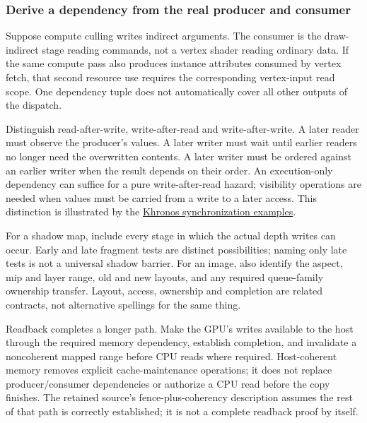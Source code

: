 \subsubsection{Derive a dependency from the real producer and consumer}\label{05-engine-i-ch019-derive-a-dependency-from-the-real-producer-and-consumer}

\hypertarget{05-engine-i-ch019-derive-a-dependency-from-the-real-producer-and-consumer}{}

Suppose compute culling writes indirect arguments. The consumer is the draw-indirect stage reading commands, not a vertex shader reading ordinary data. If the same compute pass also produces instance attributes consumed by vertex fetch, that second resource use requires the corresponding vertex-input read scope. One dependency tuple does not automatically cover all other outputs of the dispatch.

Distinguish read-after-write, write-after-read and write-after-write. A later reader must observe the producer's values. A later writer must wait until earlier readers no longer need the overwritten contents. A later writer must be ordered against an earlier writer when the result depends on their order. An execution-only dependency can suffice for a pure write-after-read hazard; visibility operations are needed when values must be carried from a write to a later access. This distinction is illustrated by the \href{https://docs.vulkan.org/guide/latest/synchronization_examples.html}{Khronos synchronization examples}.

For a shadow map, include every stage in which the actual depth writes can occur. Early and late fragment tests are distinct possibilities; naming only late tests is not a universal shadow barrier. For an image, also identify the aspect, mip and layer range, old and new layouts, and any required queue-family ownership transfer. Layout, access, ownership and completion are related contracts, not alternative spellings for the same thing.

Readback completes a longer path. Make the GPU's writes available to the host through the required memory dependency, establish completion, and invalidate a noncoherent mapped range before CPU reads where required. Host-coherent memory removes explicit cache-maintenance operations; it does not replace producer/consumer dependencies or authorize a CPU read before the copy finishes. The retained source's fence-plus-coherency description assumes the rest of that path is correctly established; it is not a complete readback proof by itself.

